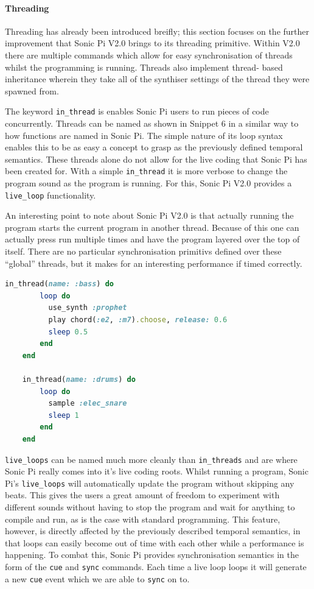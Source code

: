 \documentclass[11pt]{scrartcl}
\begin{document}
\paragraph{Threading}

Threading has already been introduced breifly; this section focuses on the 
further improvement that Sonic Pi V2.0 brings to its threading primitive. 
Within V2.0 there are multiple commands which allow for easy synchronisation 
of threads whilst the programming is running. Threads also implement thread-
based inheritance wherein they take all of the synthiser settings of the 
thread they were spawned from.

The keyword \texttt{in\_thread} is enables Sonic Pi users to run pieces of 
code concurrently. Threads can be named as shown in Snippet 6 in a similar way 
to how functions are named in Sonic Pi. The simple nature of its loop syntax 
enables this to be as easy a concept to grasp as the previously defined 
temporal semantics. These threads alone do not allow for the live coding that 
Sonic Pi has been created for. With a simple \texttt{in\_thread} it is more 
verbose to change the program sound as the program is running. For this, Sonic 
Pi V2.0 provides a \texttt{live\_loop} functionality.

An interesting point to note about Sonic Pi V2.0 is that actually running the 
program starts the current program in another thread. Because of this one can 
actually press run multiple times and have the program layered over the top of 
itself. There are no particular synchronisation primitivs defined over these 
``global'' threads, but it makes for an interesting performance if timed 
correctly.

\begin{minipage}{\textwidth}
	\begin{lstlisting}[language = ruby]
    in_thread(name: :bass) do
        loop do
          use_synth :prophet
          play chord(:e2, :m7).choose, release: 0.6
          sleep 0.5
        end
    end

    in_thread(name: :drums) do
        loop do
          sample :elec_snare
          sleep 1
        end
    end
	\end{lstlisting}
\end{minipage}

\texttt{live\_loops} can be named much more cleanly than \texttt{in\_threads} 
and are where Sonic Pi really comes into it's live coding roots. Whilst 
running a program, Sonic Pi's \texttt{live\_loops} will automatically update 
the program without skipping any beats. This gives the users a great amount of 
freedom to experiment with different sounds without having to stop the program 
and wait for anything to compile and run, as is the case with standard 
programming. This feature, however, is directly affected by the previously 
described temporal semantics, in that loops can easily become out of time with 
each other while a performance is happening. To combat this, Sonic Pi provides 
synchronisation semantics in the form of the \texttt{cue} and \texttt{sync} 
commands. Each time a live loop loops it will generate a new \texttt{cue} 
event which we are able to \texttt{sync} on to. 
\end{document}
